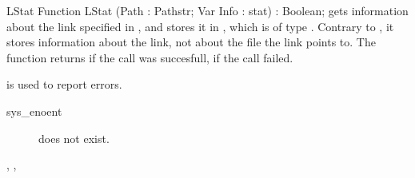 \begin{function}{LStat}
\Declaration
Function LStat (Path : Pathstr; Var Info : stat) : Boolean;
\Description
{} gets information about the link specified in , and stores it in 
, which is of type . Contrary to , it stores
information about the link, not about the file the link points to.
The function returns  if the call was succesfull,  if the call
failed.

\Errors
  is used to report errors.
\begin{description}
\item[sys\_enoent]  does not exist.
\end{description}

\SeeAlso
{}, , 
\end{function}


